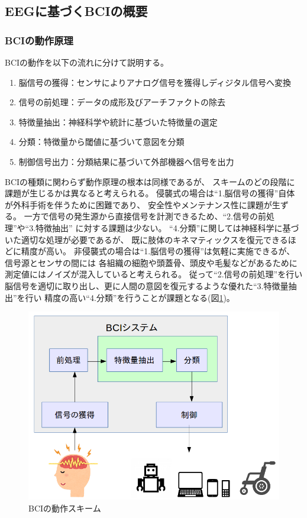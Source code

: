 \subsection{{\rm EEG}\mc に基づく{\rm BCI}{\mc の概要}}
\subsubsection{\rm BCI\mc の動作原理}
BCIの動作を以下の流れに分けて説明する。
\begin{enumerate}
    \item 脳信号の獲得：センサによりアナログ信号を獲得しディジタル信号へ変換
    \item 信号の前処理：データの成形及びアーチファクトの除去
    \item 特徴量抽出：神経科学や統計に基づいた特徴量の選定
    \item 分類：特徴量から閾値に基づいて意図を分類
    \item 制御信号出力：分類結果に基づいて外部機器へ信号を出力
\end{enumerate}
BCIの種類に関わらず動作原理の根本は同様であるが、
スキームのどの段階に課題が生じるかは異なると考えられる。
侵襲式の場合は``1.脳信号の獲得''自体が外科手術を伴うために困難であり、
安全性やメンテナンス性に課題が生ずる。
一方で信号の発生源から直接信号を計測できるため、``2.信号の前処理''や``3.特徴抽出''
に対する課題は少ない。
``4.分類''に関しては神経科学に基づいた適切な処理が必要であるが、
既に肢体のキネマティックスを復元できるほどに精度が高い。
非侵襲式の場合は``1.脳信号の獲得''は気軽に実施できるが、信号源とセンサの間には
各組織の細胞や頭蓋骨、頭皮や毛髪などがあるために測定値にはノイズが混入していると考えられる。
従って``2.信号の前処理''を行い脳信号を適切に取り出し、更に人間の意図を復元するような優れた``3.特徴量抽出''を行い
精度の高い``4.分類''を行うことが課題となる(図\ref{fig:BCIsystem})。

\begin{figure}[tb]
    \centering
    \includegraphics[width=13cm]{images/BCIsystem.png}
    \caption{BCIの動作スキーム}
    \label{fig:BCIsystem}
\end{figure}

